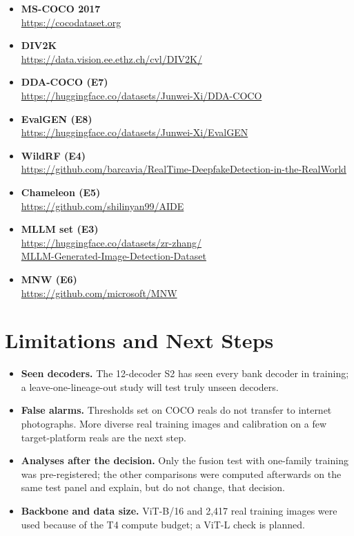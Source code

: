 \begin{itemize}
    \item \textbf{MS-COCO 2017} \\ \url{https://cocodataset.org}
    \item \textbf{DIV2K} \\ \url{https://data.vision.ee.ethz.ch/cvl/DIV2K/}
    \item \textbf{DDA-COCO (E7)} \\ \url{https://huggingface.co/datasets/Junwei-Xi/DDA-COCO}
    \item \textbf{EvalGEN (E8)} \\ \url{https://huggingface.co/datasets/Junwei-Xi/EvalGEN}
    \item \textbf{WildRF (E4)} \\ \url{https://github.com/barcavia/RealTime-DeepfakeDetection-in-the-RealWorld}
    \item \textbf{Chameleon (E5)} \\ \url{https://github.com/shilinyan99/AIDE}
    \item \textbf{MLLM set (E3)} \\ \url{https://huggingface.co/datasets/zr-zhang/} \\ \url{MLLM-Generated-Image-Detection-Dataset}
    \item \textbf{MNW (E6)} \\ \url{https://github.com/microsoft/MNW}
\end{itemize}

\section{Limitations and Next Steps}
\label{sec:limitations}

\begin{itemize}
    \item \textbf{Seen decoders.} The 12-decoder S2 has seen every bank decoder in training; a leave-one-lineage-out study will test truly unseen decoders.
    \item \textbf{False alarms.} Thresholds set on COCO reals do not transfer to internet photographs. More diverse real training images and calibration on a few target-platform reals are the next step.
    \item \textbf{Analyses after the decision.} Only the fusion test with one-family training was pre-registered; the other comparisons were computed afterwards on the same test panel and explain, but do not change, that decision.
    \item \textbf{Backbone and data size.} ViT-B/16 and 2,417 real training images were used because of the T4 compute budget; a ViT-L check is planned.
\end{itemize}
